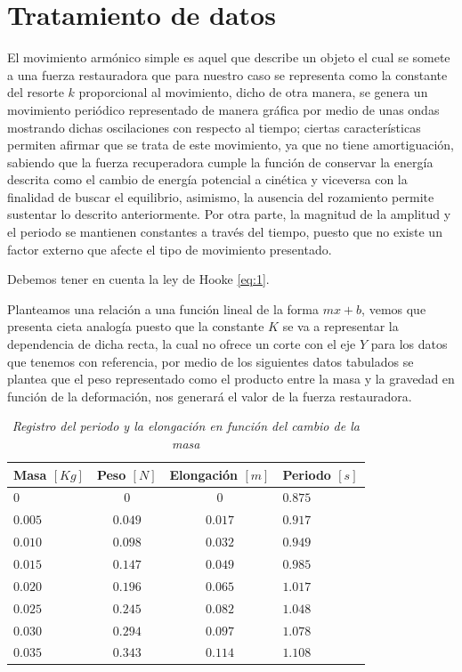 \documentclass[spanish,notitlepage,letterpaper, 12pt]{article}
\begin{document}
\section{Tratamiento de datos} \label{TD}
El movimiento armónico simple es aquel que describe un objeto el cual se somete a una fuerza restauradora que para nuestro caso se representa como la constante del resorte $k$ proporcional al movimiento, dicho de otra manera, se genera un movimiento periódico representado de manera gráfica por medio
de unas ondas mostrando dichas oscilaciones con respecto al tiempo; ciertas características permiten afirmar que se trata de este movimiento, ya que no tiene amortiguación, sabiendo que la fuerza recuperadora cumple la función de conservar la energía descrita como el cambio de energía potencial a
cinética y viceversa con la finalidad de buscar el equilibrio, asimismo, la ausencia del rozamiento permite sustentar lo descrito anteriormente. Por otra parte, la magnitud de la amplitud y el periodo se mantienen constantes a través del tiempo, puesto que no existe un factor externo que afecte el
tipo de movimiento presentado.\par
\bigskip
Debemos tener en cuenta la ley de Hooke \eqref{eq:1}.\par
\bigskip
Planteamos una relación a una función lineal de la forma $mx + b$, vemos que presenta cieta analogía puesto que la constante $K$ se va a representar la dependencia de dicha recta, la cual no ofrece un corte con el eje $Y$ para los datos que tenemos con referencia, por medio de los siguientes datos
tabulados se plantea que el peso representado como el producto entre la masa y la gravedad en función de la deformación, nos generará el valor de la fuerza restauradora.
\begin{table}[h]
    \centering
    \begin{tabular}{l|c|c|l}
        Masa $[Kg]$ & Peso $[N]$ & Elongación $[m]$ & Periodo $[s]$ \\
        \hline \hline
        $0$ & $0$ & $0$ & $0.875$\\
        $0.005$ & $0.049$ & $0.017$ & $0.917$\\
        $0.010$ & $0.098$ & $0.032$ & $0.949$\\
        $0.015$ & $0.147$ & $0.049$ & $0.985$\\
        $0.020$ & $0.196$ & $0.065$ & $1.017$\\
        $0.025$ & $0.245$ & $0.082$ & $1.048$\\
        $0.030$ & $0.294$ & $0.097$ & $1.078$\\
        $0.035$ & $0.343$ & $0.114$ & $1.108$\\
    \end{tabular}
    \caption{\textit{Registro del periodo y la elongación en función del cambio de la masa}}
    \label{Table 1}
\end{table}
\end{document}
